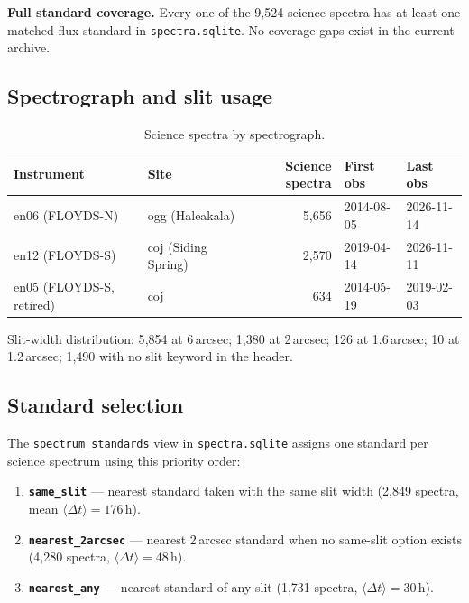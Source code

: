 \documentclass[12pt,a4paper]{article}
\begin{document}
\begin{notebox}
\textbf{Full standard coverage.}  Every one of the 9{,}524 science spectra has
at least one matched flux standard in \texttt{spectra.sqlite}.  No coverage
gaps exist in the current archive.
\end{notebox}

\subsection{Spectrograph and slit usage}

\begin{table}[h!]
\centering
\small
\begin{tabular}{llrll}
\toprule
Instrument & Site & Science spectra & First obs & Last obs \\
\midrule
en06 (FLOYDS-N) & ogg (Haleakala)     & 5{,}656 & 2014-08-05 & 2026-11-14 \\
en12 (FLOYDS-S) & coj (Siding Spring) & 2{,}570 & 2019-04-14 & 2026-11-11 \\
en05 (FLOYDS-S, retired) & coj        &   634   & 2014-05-19 & 2019-02-03 \\
\bottomrule
\end{tabular}
\caption{Science spectra by spectrograph.}
\end{table}

Slit-width distribution: 5{,}854 at 6\,arcsec; 1{,}380 at 2\,arcsec;
126 at 1.6\,arcsec; 10 at 1.2\,arcsec; 1{,}490 with no slit keyword in the
header.

\subsection{Standard selection}

The \texttt{spectrum\_standards} view in \texttt{spectra.sqlite} assigns one
standard per science spectrum using this priority order:

\begin{enumerate}
  \item \textbf{\texttt{same\_slit}} --- nearest standard taken with the same
        slit width (2{,}849 spectra, mean $\langle\Delta t\rangle = 176$\,h).
  \item \textbf{\texttt{nearest\_2arcsec}} --- nearest 2\,arcsec standard when
        no same-slit option exists (4{,}280 spectra, $\langle\Delta t\rangle =
        48$\,h).
  \item \textbf{\texttt{nearest\_any}} --- nearest standard of any slit
        (1{,}731 spectra, $\langle\Delta t\rangle = 30$\,h).
\end{enumerate}
\end{document}
